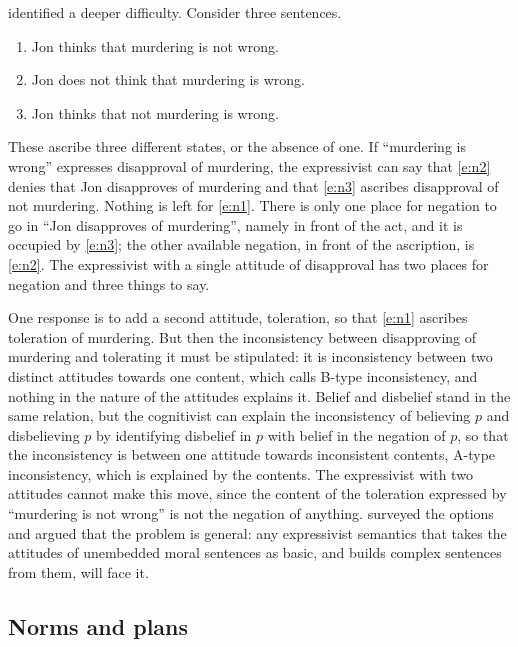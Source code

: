 \documentclass{situationist-preprint}
\begin{document}
\citet{Unwin1999,Unwin2001} identified a deeper difficulty. Consider three sentences.
\begin{enumerate}[label=(\arabic*),resume]
\item\label{e:n1} Jon thinks that murdering is not wrong.
\item\label{e:n2} Jon does not think that murdering is wrong.
\item\label{e:n3} Jon thinks that not murdering is wrong.
\end{enumerate}
These ascribe three different states, or the absence of one. If \enquote{murdering is wrong} expresses disapproval of murdering, the expressivist can say that \ref{e:n2} denies that Jon disapproves of murdering and that \ref{e:n3} ascribes disapproval of not murdering. Nothing is left for \ref{e:n1}. There is only one place for negation to go in \enquote{Jon disapproves of murdering}, namely in front of the act, and it is occupied by \ref{e:n3}; the other available negation, in front of the ascription, is \ref{e:n2}. The expressivist with a single attitude of disapproval has two places for negation and three things to say.

One response is to add a second attitude, toleration, so that \ref{e:n1} ascribes toleration of murdering. But then the inconsistency between disapproving of murdering and tolerating it must be stipulated: it is inconsistency between two distinct attitudes towards one content, which \citet{Schroeder2008nous} calls B-type inconsistency, and nothing in the nature of the attitudes explains it. Belief and disbelief stand in the same relation, but the cognitivist can explain the inconsistency of believing $p$ and disbelieving $p$ by identifying disbelief in $p$ with belief in the negation of $p$, so that the inconsistency is between one attitude towards inconsistent contents, A-type inconsistency, which is explained by the contents. The expressivist with two attitudes cannot make this move, since the content of the toleration expressed by \enquote{murdering is not wrong} is not the negation of anything. \citet{Dreier2006} surveyed the options and argued that the problem is general: any expressivist semantics that takes the attitudes of unembedded moral sentences as basic, and builds complex sentences from them, will face it.

\subsection{Norms and plans}
\end{document}
